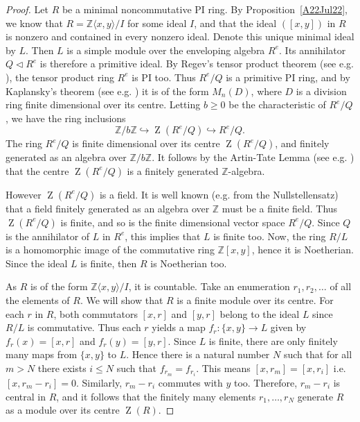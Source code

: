 \documentclass[11pt]{article}
\DeclareMathOperator{\Z}{Z}
\theoremstyle{definition}
\begin{document}
\begin{proof}
Let $R$ be a minimal noncommutative PI ring. By Proposition~\ref{A22Jul22}, we know that $R=\mathbb{Z}\langle x,y\rangle/I$ for some ideal $I$, and that the ideal $([x,y])$ in $R$ is nonzero and contained in every nonzero ideal. Denote this unique minimal ideal by $L$. Then $L$ is a simple module over the enveloping algebra $R^e$. Its annihilator $Q\lhd R^e$ is therefore a primitive ideal. By Regev's tensor product theorem (see e.g. \cite[Theorem~6.1.1]{RowenBook}), the tensor product ring $R^e$ is PI too. Thus $R^e/Q$ is a primitive PI ring, and by Kaplansky's theorem (see e.g. \cite[Theorem~1.5.16]{RowenBook}) it is of the form $M_n(D)$, where $D$ is a division ring finite dimensional over its centre. Letting $b\geq 0$ be the characteristic of $R^e/Q$, we have the ring inclusions
\[\mathbb{Z}/b\mathbb{Z}\hookrightarrow \Z(R^e/Q)\hookrightarrow R^e/Q.\]
The ring $R^e/Q$ is finite dimensional over its centre $\Z(R^e/Q)$, and finitely generated as an algebra over $\mathbb{Z}/b\mathbb{Z}$. It follows by the Artin-Tate Lemma (see e.g. \cite[Lemma~13.9.10]{McConnell-Robson}) that the centre $\Z\left(R^e/Q\right)$ is a finitely generated $\mathbb{Z}$-algebra. 

However $\Z\left(R^e/Q\right)$ is a field. It is well known (e.g. from the Nullstellensatz) that a field finitely generated as an algebra over $\mathbb{Z}$ must be a finite field. Thus $\Z\left(R^e/Q\right)$ is finite, and so is the finite dimensional vector space $R^e/Q$. Since $Q$ is the annihilator of $L$ in $R^e$, this implies that $L$ is finite too. Now, the ring $R/L$ is a homomorphic image of the commutative ring $\mathbb{Z}[x,y]$, hence it is Noetherian. Since the ideal $L$ is finite, then $R$ is Noetherian too.

As $R$ is of the form $\mathbb{Z}\langle x,y\rangle/I$, it is countable. Take an enumeration $r_1, r_2,\ldots$ of all the elements of $R$. We will show that $R$ is a finite module over its centre. For each $r$ in $R$, both commutators $[x,r]$ and $[y,r]$ belong to the ideal $L$ since $R/L$ is commutative. Thus each $r$ yields a map $f_r:\lbrace x,y\rbrace\to L$ given by $f_r(x)=[x,r]$ and $f_r(y)=[y,r]$. Since $L$ is finite, there are only finitely many maps from $\lbrace x,y\rbrace$ to $L$. Hence there is a natural number $N$ such that for all $m>N$ there exists $i\leq N$ such that $f_{r_m}=f_{r_i}$. This means $[x,r_m]=[x,r_i]$ i.e. $[x,r_m-r_i]=0$. Similarly, $r_m-r_i$ commutes with $y$ too. Therefore, $r_m-r_i$ is central in $R$, and it follows that the finitely many elements $r_1,\ldots,r_N$ generate $R$ as a module over its centre $\Z(R)$.


\end{proof}
\end{document}
